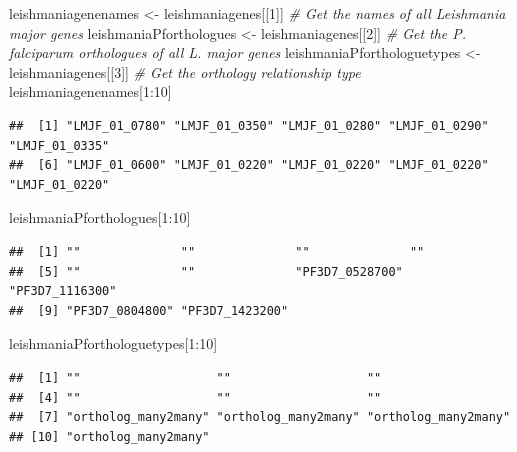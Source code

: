 \documentclass[
]{book}
\newenvironment{Shaded}{\begin{snugshade}}{\end{snugshade}}
\newcommand{\CommentTok}[1]{\textcolor[rgb]{0.56,0.35,0.01}{\textit{#1}}}
\newcommand{\DecValTok}[1]{\textcolor[rgb]{0.00,0.00,0.81}{#1}}
\newcommand{\NormalTok}[1]{#1}
\newcommand{\OtherTok}[1]{\textcolor[rgb]{0.56,0.35,0.01}{#1}}
\newcommand{\SpecialCharTok}[1]{\textcolor[rgb]{0.00,0.00,0.00}{#1}}
\begin{document}
\begin{Shaded}
\begin{Highlighting}[]
\NormalTok{leishmaniagenenames }\OtherTok{\textless{}{-}}\NormalTok{ leishmaniagenes[[}\DecValTok{1}\NormalTok{]]      }\CommentTok{\# Get the names of all Leishmania major genes}
\NormalTok{leishmaniaPforthologues }\OtherTok{\textless{}{-}}\NormalTok{ leishmaniagenes[[}\DecValTok{2}\NormalTok{]]  }\CommentTok{\# Get the P. falciparum orthologues of all L. major genes}
\NormalTok{leishmaniaPforthologuetypes }\OtherTok{\textless{}{-}}\NormalTok{ leishmaniagenes[[}\DecValTok{3}\NormalTok{]] }\CommentTok{\# Get the orthology relationship type}
\NormalTok{leishmaniagenenames[}\DecValTok{1}\SpecialCharTok{:}\DecValTok{10}\NormalTok{]}
\end{Highlighting}
\end{Shaded}

\begin{verbatim}
##  [1] "LMJF_01_0780" "LMJF_01_0350" "LMJF_01_0280" "LMJF_01_0290" "LMJF_01_0335"
##  [6] "LMJF_01_0600" "LMJF_01_0220" "LMJF_01_0220" "LMJF_01_0220" "LMJF_01_0220"
\end{verbatim}

\begin{Shaded}
\begin{Highlighting}[]
\NormalTok{leishmaniaPforthologues[}\DecValTok{1}\SpecialCharTok{:}\DecValTok{10}\NormalTok{]}
\end{Highlighting}
\end{Shaded}

\begin{verbatim}
##  [1] ""              ""              ""              ""             
##  [5] ""              ""              "PF3D7_0528700" "PF3D7_1116300"
##  [9] "PF3D7_0804800" "PF3D7_1423200"
\end{verbatim}

\begin{Shaded}
\begin{Highlighting}[]
\NormalTok{leishmaniaPforthologuetypes[}\DecValTok{1}\SpecialCharTok{:}\DecValTok{10}\NormalTok{]}
\end{Highlighting}
\end{Shaded}

\begin{verbatim}
##  [1] ""                   ""                   ""                  
##  [4] ""                   ""                   ""                  
##  [7] "ortholog_many2many" "ortholog_many2many" "ortholog_many2many"
## [10] "ortholog_many2many"
\end{verbatim}
\end{document}

